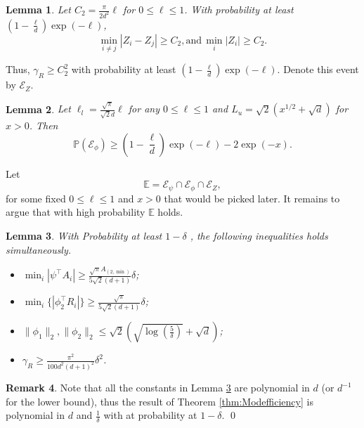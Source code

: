 \documentclass[twoside]{article}
\newcommand{\Epsi}{\mathcal{E}_{\psi}}
\newcommand{\Ephi}{\mathcal{E}_{\phi}}
\newcommand{\EZ}{\mathcal{E}_{Z}}
\newcommand{\E}{\mathbb{E}}
\newcommand{\Prob}[1]{\mathbb{P}\left(#1\right)}
\newtheorem{lemma}{Lemma}[section]
\theoremstyle{definition}
\newtheorem{remark}[lemma]{Remark}
\begin{document}
\begin{lemma}
\label{lem:CauchyGap}
Let $C_2 = \frac{\pi}{2d^2}\ell$ for $0\le \ell\le 1$. 
With probability at least $\left(1- \frac{\ell}{d}\right)\exp(-\ell)$,
\[
\min_{i\neq j} \left\vert Z_i - Z_j \right\vert \ge C_2, \text{and} \,  \min_i\vert Z_i\vert \ge C_2.
\]
\end{lemma}
Thus, $\gamma_R \ge C_2^2$ with probability at least $\left(1- \frac{\ell}{d}\right)\exp(-\ell)$.
Denote this event by $\EZ$.
\begin{lemma}
\label{lem:EventphiProb}
Let $\ell_l = \frac{\sqrt{\pi}}{\sqrt{2}d}\ell$ for any $0\le \ell\le 1$ and $ L_u = \sqrt{2}\left(x^{1/2}+\sqrt{d}\right)$ for $x>0$. Then
\[
\Prob{\Ephi} \ge \left(1- \frac{\ell}{d}\right)\exp(-\ell) - 2\exp(-x).
\]
\end{lemma}
Let  
\[
\E = \Epsi \cap\Ephi \cap \EZ,
\]
for some fixed $0\le \ell\le 1$ and $x>0$ that would be picked later.
It remains to argue that with high probability $\E$ holds.
\begin{lemma}
\label{lem:ConstantProb}
With Probability at least $1-\delta$ , the following inequalities holds simultaneously.
\begin{itemize}
\vspace{-3mm}
\item $\min_i |\psi^{\top}A_i| \ge \frac{\sqrt{\pi}A_{(2,\min)}}{5\sqrt{2}(d+1)} \delta$;
\item $\min_i \{|\phi_2^{\top}R_i|\} \ge \frac{\sqrt{\pi}}{5\sqrt{2}(d+1)}\delta$;
\item $\|\phi_1\|_2, \|\phi_2\|_2 \le \sqrt{2}\left(\sqrt{\log(\frac{5}{\delta})}+\sqrt{d}\right)$;
\item $\gamma_R \ge\frac{\pi^2}{100d^2(d+1)^2}\delta^2$.
\end{itemize}
\vspace{-2mm}
\end{lemma}
\begin{remark}
Note that all the constants in Lemma \ref{lem:ConstantProb} are polynomial in $d$ (or $d^{-1}$ for the lower bound), thus the result of Theorem \ref{thm:Modefficiency} is polynomial in $d$ and $\frac{1}{\delta}$ with at probability at $1-\delta$. \qed
\end{remark}
\end{document}

